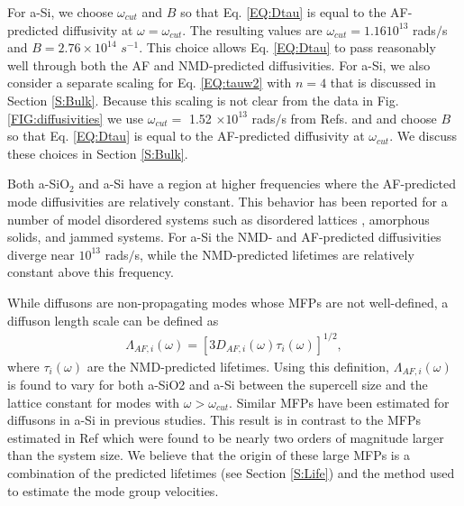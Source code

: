 \documentclass[aps,prb,onecolumn,preprint,superscriptaddress,footinbib,amsmath,amssymb,floatfix]{revtex4}
\begin{document}
For a-Si, we choose $\omega_{cut}$  
and $B$ so that Eq. \eqref{EQ:Dtau} is equal 
to the AF-predicted diffusivity at $\omega=\omega_{cut}$. The resulting values are 
$\omega_{cut}=1.16 10^13$ rads$/$s and $B=2.76\times10^{14}$ $s^{-1}$. This choice 
allows Eq. \eqref{EQ:Dtau} to pass reasonably well through both the AF and NMD-predicted 
diffusivities. For a-Si, we also consider a separate scaling 
for Eq. \eqref{EQ:tauw2} with $n=4$ that is discussed in 
Section \ref{S:Bulk}. 
Because this scaling is not clear from the data in Fig. \ref{FIG:diffusivities} 
we use $\omega_{cut} = $ 1.52 $\times 10^{13}$ rads$/$s  
from Refs. \cite{feldman_thermal_1993} and \cite{cahill_thermal_1994} 
and choose $B$ so that Eq. \eqref{EQ:Dtau} is equal to the AF-predicted 
diffusivity at $\omega_{cut}$. We discuss these choices in 
Section \ref{S:Bulk}. 

Both a-SiO$_2$ and a-Si have a region at higher frequencies where the 
AF-predicted mode diffusivities are relatively constant. This behavior 
has been reported for a number of model disordered systems such as 
disordered lattices
\cite{sheng_heat_1991,beltukov_ioffe-regel_2013,larkin_predicting_2013}, 
amorphous solids,\cite{he_thermal_2011} 
and jammed systems.\cite{xu_energy_2009,vitelli_heat_2010}  
For a-Si the NMD- and AF-predicted diffusivities diverge 
near $10^{13}$ rads$/$s, while the NMD-predicted lifetimes 
are relatively constant above this frequency.  

While diffusons are non-propagating modes whose MFPs are not 
well-defined, a diffuson length scale can be defined as
\begin{equation}\label{EQ:LambdaAF}
\begin{split}
\Lambda_{AF,i}(\omega) = [3D_{AF,i}(\omega)\tau_{i}(\omega)]^{1/2},
\end{split}
\end{equation}
where $\tau_{i}(\omega)$ are the NMD-predicted lifetimes. Using this 
definition, $\Lambda_{AF,i}(\omega)$ is found to vary 
for both a-SiO2 and a-Si between 
the supercell size and the lattice constant 
for modes with $\omega > \omega_{cut}$. 
Similar MFPs have been estimated for diffusons in a-Si in 
previous studies.\cite{feldman_thermal_1993,feldman_numerical_1999} 
This result is in contrast to the MFPs estimated in 
Ref 
which were found to be nearly two orders of magnitude larger than the 
system size. We believe that the origin of these large MFPs 
is a combination of the predicted lifetimes (see Section \ref{S:Life}) 
and the method used to estimate the mode group velocities.
\cite{he_heat_2011}
\end{document}
